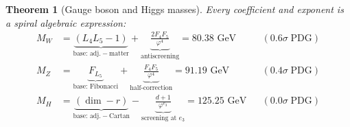 \documentclass[12pt,a4paper]{article}
\newtheorem{theorem}{Theorem}[section]
\begin{document}
\begin{theorem}[Gauge boson and Higgs masses]
\label{thm:boson-masses}
Every coefficient and exponent is a spiral algebraic expression:
\begin{align}
M_W &= \underbrace{(L_4 L_5 - 1)}_{\text{base: adj.}\ -\ \text{matter}} + \underbrace{\frac{2F_4 F_5}{\varphi^4}}_{\text{antiscreening}} = 80.38\text{ GeV} && (0.6\sigma\;\text{PDG}) \label{eq:mw-derived} \\
M_Z &= \underbrace{F_{L_5}}_{\text{base: Fibonacci}} + \underbrace{\frac{F_4 F_5}{\varphi^4}}_{\text{half-correction}} = 91.19\text{ GeV} && (0.4\sigma\;\text{PDG}) \label{eq:mz-derived} \\
M_H &= \underbrace{(\dim - r)}_{\text{base: adj.}\ -\ \text{Cartan}} - \underbrace{\frac{d+1}{\varphi^{e_3}}}_{\text{screening at } e_3} = 125.25\text{ GeV} && (0.0\sigma\;\text{PDG}) \label{eq:mh-derived}
\end{align}
\end{theorem}
\end{document}
